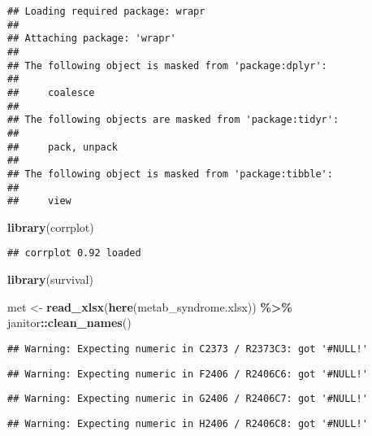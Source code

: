 \documentclass[
]{article}
\newenvironment{Shaded}{\begin{snugshade}}{\end{snugshade}}
\newcommand{\FunctionTok}[1]{\textcolor[rgb]{0.13,0.29,0.53}{\textbf{#1}}}
\newcommand{\NormalTok}[1]{#1}
\newcommand{\OtherTok}[1]{\textcolor[rgb]{0.56,0.35,0.01}{#1}}
\newcommand{\SpecialCharTok}[1]{\textcolor[rgb]{0.81,0.36,0.00}{\textbf{#1}}}
\newcommand{\StringTok}[1]{\textcolor[rgb]{0.31,0.60,0.02}{#1}}
\begin{document}
\begin{verbatim}
## Loading required package: wrapr
## 
## Attaching package: 'wrapr'
## 
## The following object is masked from 'package:dplyr':
## 
##     coalesce
## 
## The following objects are masked from 'package:tidyr':
## 
##     pack, unpack
## 
## The following object is masked from 'package:tibble':
## 
##     view
\end{verbatim}

\begin{Shaded}
\begin{Highlighting}[]
\FunctionTok{library}\NormalTok{(corrplot)}
\end{Highlighting}
\end{Shaded}

\begin{verbatim}
## corrplot 0.92 loaded
\end{verbatim}

\begin{Shaded}
\begin{Highlighting}[]
\FunctionTok{library}\NormalTok{(survival)}
\end{Highlighting}
\end{Shaded}

\begin{Shaded}
\begin{Highlighting}[]
\NormalTok{met }\OtherTok{\textless{}{-}} \FunctionTok{read\_xlsx}\NormalTok{(}\FunctionTok{here}\NormalTok{(}\StringTok{\textquotesingle{}metab\_syndrome.xlsx\textquotesingle{}}\NormalTok{)) }\SpecialCharTok{\%\textgreater{}\%} 
\NormalTok{  janitor}\SpecialCharTok{::}\FunctionTok{clean\_names}\NormalTok{()}
\end{Highlighting}
\end{Shaded}

\begin{verbatim}
## Warning: Expecting numeric in C2373 / R2373C3: got '#NULL!'
\end{verbatim}

\begin{verbatim}
## Warning: Expecting numeric in F2406 / R2406C6: got '#NULL!'
\end{verbatim}

\begin{verbatim}
## Warning: Expecting numeric in G2406 / R2406C7: got '#NULL!'
\end{verbatim}

\begin{verbatim}
## Warning: Expecting numeric in H2406 / R2406C8: got '#NULL!'
\end{verbatim}
\end{document}
